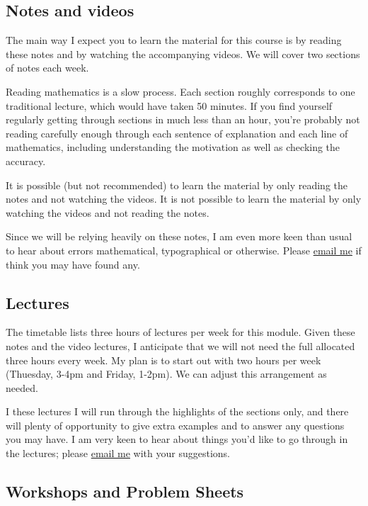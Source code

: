 \documentclass[
  a4paper,
]{article}
\theoremstyle{definition}
\theoremstyle{definition}
\theoremstyle{definition}
\theoremstyle{definition}
\theoremstyle{remark}
\begin{document}
\hypertarget{notes}{%
\subsection*{Notes and videos}\label{notes}}

The main way I expect you to learn the material for this course is by
reading these notes and by watching the accompanying videos. We will
cover two sections of notes each week.

Reading mathematics is a slow process. Each section roughly
corresponds to one traditional lecture, which would have taken 50
minutes. If you find yourself regularly getting through sections in
much less than an hour, you're probably not reading carefully enough
through each sentence of explanation and each line of mathematics,
including understanding the motivation as well as checking the
accuracy.

It is possible (but not recommended) to learn the material by only
reading the notes and not watching the videos. It is not possible to
learn the material by only watching the videos and not reading the
notes.

Since we will be relying heavily on these notes, I am even more
keen than usual to hear about errors mathematical, typographical or
otherwise. Please \href{mailto:J.Voss@leeds.ac.uk}{email me} if
think you may have found any.

\hypertarget{lectures}{%
\subsection*{Lectures}\label{lectures}}

The timetable lists three hours of lectures per week for this module.
Given these notes and the video lectures, I anticipate that we will not
need the full allocated three hours every week. My plan is to start out
with two hours per week (Thuesday, 3-4pm and Friday, 1-2pm). We can
adjust this arrangement as needed.

I these lectures I will run through the highlights of the sections only,
and there will plenty of opportunity to give extra examples and to answer
any questions you may have.
I am very keen to hear about things you'd like to go through in the
lectures; please \href{mailto:J.Voss@leeds.ac.uk}{email me} with your
suggestions.

\hypertarget{workshops}{%
\subsection*{Workshops and Problem Sheets}\label{workshops}}
\end{document}
